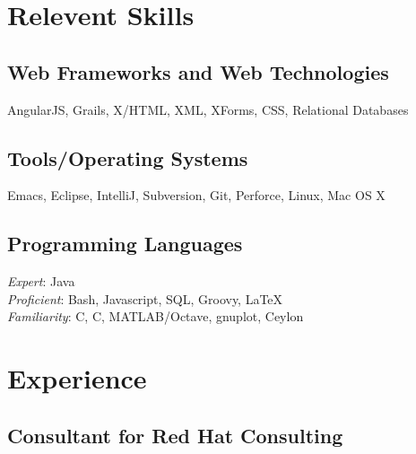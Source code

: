 \documentclass[a4paper,11pt]{article}
\newcommand{\CC}{C\nolinebreak\hspace{-.05em}\raisebox{.4ex}{\tiny\bf
    +}\nolinebreak\hspace{-.10em}\raisebox{.4ex}{\tiny\bf +}}
\def\CC{{C\nolinebreak[4]\hspace{-.05em}\raisebox{.4ex}{\tiny\bf ++}}}
\begin{document}

  \section*{Relevent Skills}

  \begin{multicols}{2} \raggedright

  \subsection*{Web Frameworks and Web Technologies}

  AngularJS, Grails, X/HTML, XML, XForms, CSS, Relational Databases

  \subsection*{Tools/Operating Systems}

  Emacs, Eclipse, IntelliJ, Subversion, Git, Perforce, Linux, Mac OS X

  \subsection*{Programming Languages}

  \textsl{Expert}: Java \\
  \textsl{Proficient}: Bash, Javascript, SQL, Groovy, \LaTeX \\
  \textsl{Familiarity}: C, \CC, MATLAB/Octave, gnuplot, Ceylon

\end{multicols}


\section*{Experience}

\subsection*{Consultant for Red Hat Consulting}
\end{document}
